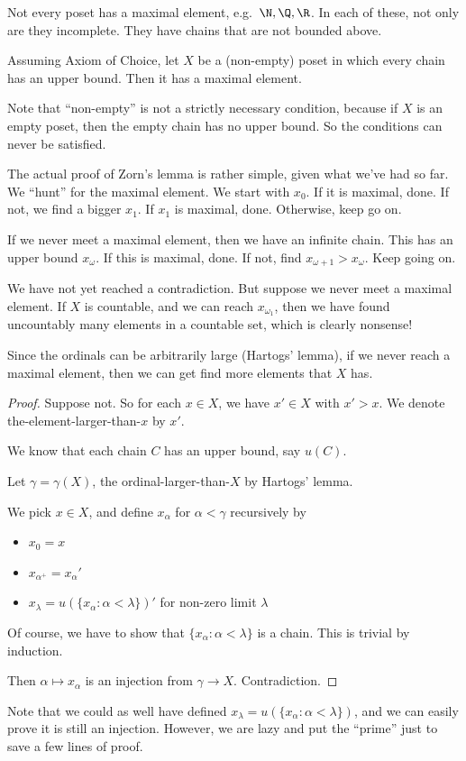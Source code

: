 \documentclass[a4paper]{article}
\begin{document}
Not every poset has a maximal element, e.g.\ $\N, \Q, \R$. In each of these, not only are they incomplete. They have chains that are not bounded above.

\begin{thm}
  Assuming Axiom of Choice, let $X$ be a (non-empty) poset in which every chain has an upper bound. Then it has a maximal element.
\end{thm}
Note that ``non-empty'' is not a strictly necessary condition, because if $X$ is an empty poset, then the empty chain has no upper bound. So the conditions can never be satisfied.

The actual proof of Zorn's lemma is rather simple, given what we've had so far. We ``hunt'' for the maximal element. We start with $x_0$. If it is maximal, done. If not, we find a bigger $x_1$. If $x_1$ is maximal, done. Otherwise, keep go on.

If we never meet a maximal element, then we have an infinite chain. This has an upper bound $x_\omega$. If this is maximal, done. If not, find $x_{\omega + 1} > x_\omega$. Keep going on.

We have not yet reached a contradiction. But suppose we never meet a maximal element. If $X$ is countable, and we can reach $x_{\omega_1}$, then we have found uncountably many elements in a countable set, which is clearly nonsense!

Since the ordinals can be arbitrarily large (Hartogs' lemma), if we never reach a maximal element, then we can get find more elements that $X$ has.

\begin{proof}
  Suppose not. So for each $x\in X$, we have $x'\in X$ with $x' > x$. We denote the-element-larger-than-$x$ by $x'$.

  We know that each chain $C$ has an upper bound, say $u(C)$.

  Let $\gamma = \gamma(X)$, the ordinal-larger-than-$X$ by Hartogs' lemma.

  We pick $x\in X$, and define $x_\alpha$ for $\alpha < \gamma$ recursively by
  \begin{itemize}
    \item $x_0 = x$
    \item $x_{\alpha^+} = x_\alpha'$
    \item $x_{\lambda} = u(\{x_\alpha: \alpha < \lambda\})'$ for non-zero limit $\lambda$
  \end{itemize}
  Of course, we have to show that $\{x_\alpha: \alpha < \lambda\}$ is a chain. This is trivial by induction.

  Then $\alpha \mapsto x_\alpha$ is an injection from $\gamma\to X$. Contradiction.
\end{proof}
Note that we could as well have defined $x_\lambda = u(\{x_\alpha : \alpha < \lambda\})$, and we can easily prove it is still an injection. However, we are lazy and put the ``prime'' just to save a few lines of proof.
\end{document}
